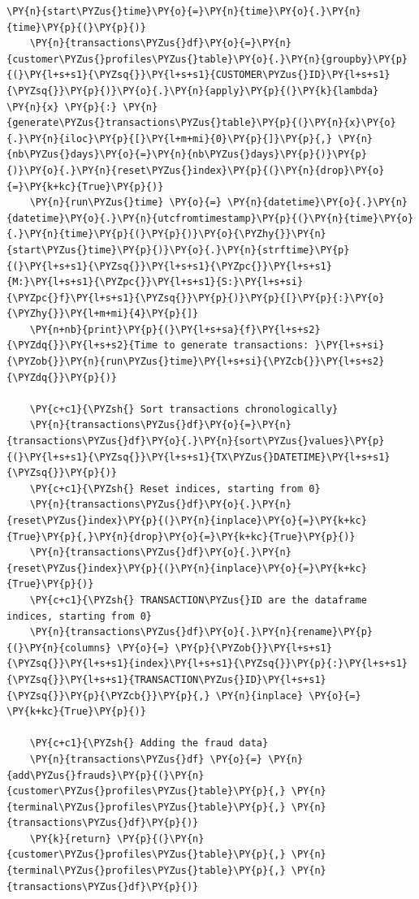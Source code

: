 \begin{tcolorbox}[breakable, size=fbox, boxrule=1pt, pad at break*=1mm,colback=cellbackground, colframe=cellborder]
\begin{Verbatim}[commandchars=\\\{\}]
    \PY{n}{start\PYZus{}time}\PY{o}{=}\PY{n}{time}\PY{o}{.}\PY{n}{time}\PY{p}{(}\PY{p}{)}
    \PY{n}{transactions\PYZus{}df}\PY{o}{=}\PY{n}{customer\PYZus{}profiles\PYZus{}table}\PY{o}{.}\PY{n}{groupby}\PY{p}{(}\PY{l+s+s1}{\PYZsq{}}\PY{l+s+s1}{CUSTOMER\PYZus{}ID}\PY{l+s+s1}{\PYZsq{}}\PY{p}{)}\PY{o}{.}\PY{n}{apply}\PY{p}{(}\PY{k}{lambda} \PY{n}{x} \PY{p}{:} \PY{n}{generate\PYZus{}transactions\PYZus{}table}\PY{p}{(}\PY{n}{x}\PY{o}{.}\PY{n}{iloc}\PY{p}{[}\PY{l+m+mi}{0}\PY{p}{]}\PY{p}{,} \PY{n}{nb\PYZus{}days}\PY{o}{=}\PY{n}{nb\PYZus{}days}\PY{p}{)}\PY{p}{)}\PY{o}{.}\PY{n}{reset\PYZus{}index}\PY{p}{(}\PY{n}{drop}\PY{o}{=}\PY{k+kc}{True}\PY{p}{)}
    \PY{n}{run\PYZus{}time} \PY{o}{=} \PY{n}{datetime}\PY{o}{.}\PY{n}{datetime}\PY{o}{.}\PY{n}{utcfromtimestamp}\PY{p}{(}\PY{n}{time}\PY{o}{.}\PY{n}{time}\PY{p}{(}\PY{p}{)}\PY{o}{\PYZhy{}}\PY{n}{start\PYZus{}time}\PY{p}{)}\PY{o}{.}\PY{n}{strftime}\PY{p}{(}\PY{l+s+s1}{\PYZsq{}}\PY{l+s+s1}{\PYZpc{}}\PY{l+s+s1}{M:}\PY{l+s+s1}{\PYZpc{}}\PY{l+s+s1}{S:}\PY{l+s+si}{\PYZpc{}f}\PY{l+s+s1}{\PYZsq{}}\PY{p}{)}\PY{p}{[}\PY{p}{:}\PY{o}{\PYZhy{}}\PY{l+m+mi}{4}\PY{p}{]}
    \PY{n+nb}{print}\PY{p}{(}\PY{l+s+sa}{f}\PY{l+s+s2}{\PYZdq{}}\PY{l+s+s2}{Time to generate transactions: }\PY{l+s+si}{\PYZob{}}\PY{n}{run\PYZus{}time}\PY{l+s+si}{\PYZcb{}}\PY{l+s+s2}{\PYZdq{}}\PY{p}{)}

    \PY{c+c1}{\PYZsh{} Sort transactions chronologically}
    \PY{n}{transactions\PYZus{}df}\PY{o}{=}\PY{n}{transactions\PYZus{}df}\PY{o}{.}\PY{n}{sort\PYZus{}values}\PY{p}{(}\PY{l+s+s1}{\PYZsq{}}\PY{l+s+s1}{TX\PYZus{}DATETIME}\PY{l+s+s1}{\PYZsq{}}\PY{p}{)}
    \PY{c+c1}{\PYZsh{} Reset indices, starting from 0}
    \PY{n}{transactions\PYZus{}df}\PY{o}{.}\PY{n}{reset\PYZus{}index}\PY{p}{(}\PY{n}{inplace}\PY{o}{=}\PY{k+kc}{True}\PY{p}{,}\PY{n}{drop}\PY{o}{=}\PY{k+kc}{True}\PY{p}{)}
    \PY{n}{transactions\PYZus{}df}\PY{o}{.}\PY{n}{reset\PYZus{}index}\PY{p}{(}\PY{n}{inplace}\PY{o}{=}\PY{k+kc}{True}\PY{p}{)}
    \PY{c+c1}{\PYZsh{} TRANSACTION\PYZus{}ID are the dataframe indices, starting from 0}
    \PY{n}{transactions\PYZus{}df}\PY{o}{.}\PY{n}{rename}\PY{p}{(}\PY{n}{columns} \PY{o}{=} \PY{p}{\PYZob{}}\PY{l+s+s1}{\PYZsq{}}\PY{l+s+s1}{index}\PY{l+s+s1}{\PYZsq{}}\PY{p}{:}\PY{l+s+s1}{\PYZsq{}}\PY{l+s+s1}{TRANSACTION\PYZus{}ID}\PY{l+s+s1}{\PYZsq{}}\PY{p}{\PYZcb{}}\PY{p}{,} \PY{n}{inplace} \PY{o}{=} \PY{k+kc}{True}\PY{p}{)}

    \PY{c+c1}{\PYZsh{} Adding the fraud data}
    \PY{n}{transactions\PYZus{}df} \PY{o}{=} \PY{n}{add\PYZus{}frauds}\PY{p}{(}\PY{n}{customer\PYZus{}profiles\PYZus{}table}\PY{p}{,} \PY{n}{terminal\PYZus{}profiles\PYZus{}table}\PY{p}{,} \PY{n}{transactions\PYZus{}df}\PY{p}{)}
    \PY{k}{return} \PY{p}{(}\PY{n}{customer\PYZus{}profiles\PYZus{}table}\PY{p}{,} \PY{n}{terminal\PYZus{}profiles\PYZus{}table}\PY{p}{,} \PY{n}{transactions\PYZus{}df}\PY{p}{)}
\end{Verbatim}
\end{tcolorbox}


